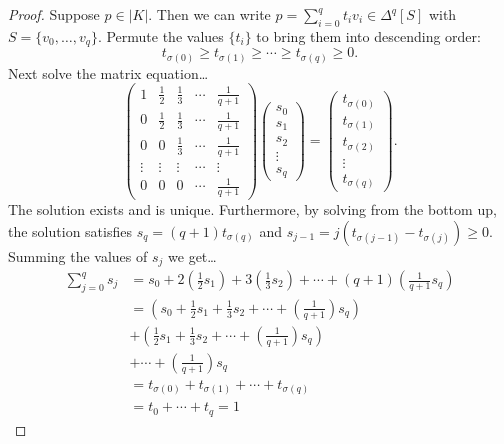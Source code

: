 \begin{proof}
Suppose $p \in |K|$. Then we can write $p = \sum_{i=0}^q t_i v_i \in \Delta^q [S]$
with $S = \{ v_0, \dots, v_q \}.$ Permute the values $\{ t_i \}$ to bring them into descending order:
$$t_{\sigma(0)} \geq t_{\sigma(1)} \geq \cdots \geq t_{\sigma(q)} \geq 0.$$
Next solve the matrix equation\dots
\[
\begin{pmatrix}
1 & \frac{1}{2} & \frac{1}{3} & \cdots & \frac{1}{q+1}\\
0 & \frac{1}{2} & \frac{1}{3} & \cdots & \frac{1}{q+1}\\
0 & 0		    & \frac{1}{3} & \cdots & \frac{1}{q+1}\\
\vdots & \vdots	    & \vdots      & \cdots & \vdots	  \\
0 & 0		    & 0			  & \cdots & \frac{1}{q+1}
\end{pmatrix}
\begin{pmatrix}
s_0\\
s_1\\
s_2\\
\vdots\\
s_q
\end{pmatrix}
=
\begin{pmatrix}
t_{\sigma(0)}\\
t_{\sigma(1)}\\
t_{\sigma(2)}\\
\vdots\\
t_{\sigma(q)}
\end{pmatrix}.
\]
The solution exists and is unique. Furthermore, by solving from the bottom up, the solution satisfies
$s_q = (q+1)t_{\sigma(q)}$ and $s_{j-1} = j(t_{\sigma(j-1)}-t_{\sigma(j)}) \geq 0$. Summing the values of $s_j$
we get\dots
\begin{align*}
\sum_{j=0}^q s_j &= s_0 + 2\left(\frac{1}{2}s_1\right) + 3\left(\frac{1}{3}s_2\right) + \cdots + (q+1)\left(\frac{1}{q+1}s_q\right)\\
				 &= \left(s_0 + \frac{1}{2}s_1 + \frac{1}{3}s_2 + \cdots + \left(\frac{1}{q+1}\right)s_q\right)\\
				 &+ \left(\frac{1}{2}s_1 + \frac{1}{3}s_2 + \cdots + \left(\frac{1}{q+1}\right)s_q\right)\\
				 &+ \cdots + \left(\frac{1}{q+1}\right)s_q\\
				 &= t_{\sigma(0)} + t_{\sigma(1)} + \cdots + t_{\sigma(q)}\\
				 &= t_0 + \cdots + t_q = 1
\end{align*}
\end{proof}

